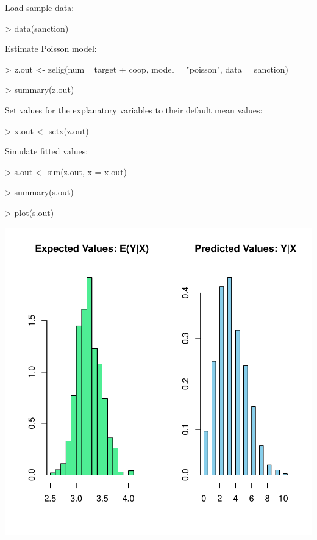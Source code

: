 Load sample data:  
\begin{Schunk}
\begin{Sinput}
> data(sanction)
\end{Sinput}
\end{Schunk}
Estimate Poisson model:  
\begin{Schunk}
\begin{Sinput}
> z.out <- zelig(num ~ target + coop, model = "poisson", data = sanction)
\end{Sinput}
\end{Schunk}
\begin{Schunk}
\begin{Sinput}
> summary(z.out)
\end{Sinput}
\end{Schunk}
Set values for the explanatory variables to their default mean values:  
\begin{Schunk}
\begin{Sinput}
> x.out <- setx(z.out)
\end{Sinput}
\end{Schunk}
Simulate fitted values:  
\begin{Schunk}
\begin{Sinput}
> s.out <- sim(z.out, x = x.out)
\end{Sinput}
\end{Schunk}
\begin{Schunk}
\begin{Sinput}
> summary(s.out)
\end{Sinput}
\end{Schunk}
\begin{center}
\begin{Schunk}
\begin{Sinput}
> plot(s.out)
\end{Sinput}
\end{Schunk}
\includegraphics{vigpics/poisson-ExamplePlot}
\end{center}

